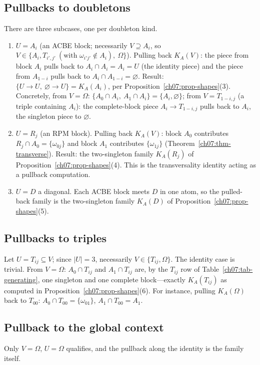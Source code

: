 \subsection{Pullbacks to doubletons}
There are three subcases, one per doubleton kind.
\begin{enumerate}
\item $U=A_{i}$ (an ACBE block; necessarily $V\supseteq A_{i}$, so $V\in\{A_{i}, T_{i',j'}\ (\text{with }\omega_{i'j'}\notin A_{i}),\ \Omega\}$). Pulling back $K_{A}(V)$: the piece from block $A_{i}$ pulls back to $A_{i}\cap A_{i}=A_{i}=U$ (the identity piece) and the piece from $A_{1-i}$ pulls back to $A_{i}\cap A_{1-i}=\varnothing$. Result: $\{U\to U,\ \varnothing\to U\}=K_{A}(A_{i})$, per Proposition~\ref{ch07:prop-shapes}(3). Concretely, from $V=\Omega$: $\{A_{0}\cap A_{i},\ A_{1}\cap A_{i}\}=\{A_{i},\varnothing\}$; from $V=T_{1-i,j}$ (a triple containing $A_{i}$): the complete-block piece $A_{i}\to T_{1-i,j}$ pulls back to $A_{i}$, the singleton piece to $\varnothing$.
\item $U=R_{j}$ (an RPM block). Pulling back $K_{A}(V)$: block $A_{0}$ contributes $R_{j}\cap A_{0}=\{\omega_{0j}\}$ and block $A_{1}$ contributes $\{\omega_{1j}\}$ (Theorem~\ref{ch07:thm-transverse}). Result: the two-singleton family $K_{A}(R_{j})$ of Proposition~\ref{ch07:prop-shapes}(4). This is the transversality identity acting as a pullback computation.
\item $U=D$ a diagonal. Each ACBE block meets $D$ in one atom, so the pulled-back family is the two-singleton family $K_{A}(D)$ of Proposition~\ref{ch07:prop-shapes}(5).
\end{enumerate}

\subsection{Pullbacks to triples}
Let $U=T_{ij}\subseteq V$; since $|U|=3$, necessarily $V\in\{T_{ij},\Omega\}$. The identity case is trivial. From $V=\Omega$: $A_{0}\cap T_{ij}$ and $A_{1}\cap T_{ij}$ are, by the $T_{ij}$ row of Table~\ref{ch07:tab-generating}, one singleton and one complete block---exactly $K_{A}(T_{ij})$ as computed in Proposition~\ref{ch07:prop-shapes}(6). For instance, pulling $K_{A}(\Omega)$ back to $T_{00}$: $A_{0}\cap T_{00}=\{\omega_{01}\}$, $A_{1}\cap T_{00}=A_{1}$.

\subsection{Pullback to the global context}
Only $V=\Omega$, $U=\Omega$ qualifies, and the pullback along the identity is the family itself.

